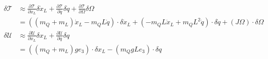 \begin{equation}\label{eq:mod.T}
\begin{aligned}
\delta\mathcal{T}&\approx \frac{\partial \mathcal{T}}{\partial\dot{x}_L} \delta\dot{x}_L +\frac{\partial \mathcal{T}}{\partial\dot{q}}\delta\dot{q}+\frac{\partial \mathcal{T}}{\partial\Omega}\delta\Omega\\
&=((m_Q+m_L)\dot{x}_L-m_QL\dot{q})\cdot\delta\dot{x}_L+(-m_QL\dot{x}_L+m_QL^2\dot{q})\cdot\delta\dot{q}+(J\Omega)\cdot\delta\Omega\\
%
\delta\mathcal{U}&\approx \frac{\partial \mathcal{U}}{\partial{x}_L} \delta{x}_L +\frac{\partial \mathcal{U}}{\partial{q}}\delta{q}\\
&=((m_Q+m_L)ge_3)\cdot\delta x_L-(m_QgLe_3)\cdot\delta q
\end{aligned}
\end{equation}

